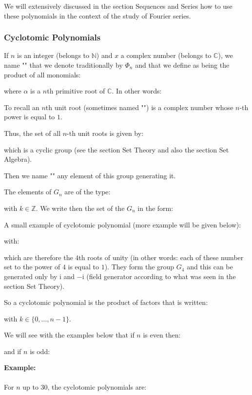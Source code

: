 	We will extensively discussed in the section Sequences and Series how to use these polynomials in the context of the study of Fourier series.
	
	\subsubsection{Cyclotomic Polynomials}
	If $n$ is an integer (belongs to $\mathbb{N}$) and $x$ a complex number (belongs to $\mathbb{C}$), we name "" that we denote traditionally by $\Phi_n$ and that we define as being the product of all monomials:
	
	where $\alpha$ is a $n$th primitive root of $\mathbb{C}$. In other words:
	
	To recall an $n$th unit root (sometimes named "") is a complex number whose $n$-th power is equal to $1$.
	
	Thus, the set of all $n$-th unit roots is given by:
	
	which is a cyclic group (see the section Set Theory and also the section Set Algebra).

	Then we name "" any element of this group generating it.
	
	The elements of $G_n$ are of the type:
	
	with $k\in \mathbb{Z}$. We write then the set of the $G_n$ in the form:
	
	A small example of cyclotomic polynomial (more example will be given below):
	
	with:
	
	which are therefore the $4$th roots of unity (in other words: each of these number set to the power of $4$ is equal to $1$). They form the group $G_4$ and this can be generated only by $\mathrm{i}$ and $-\mathrm{i}$ (field generator according to what was seen in the section Set Theory).
	
	So a cyclotomic polynomial is the product of factors that is written:
	
	with $k\in \{0,\ldots,n-1\}$.
	
	We will see with the examples below that if $n$ is even then:
	
	and if $n$ is odd:
	
	
	\pagebreak
	\begin{tcolorbox}[colframe=black,colback=white,sharp corners]
	\textbf{{\Large {}}Example:}\\\\
	For $n$ up to $30$, the cyclotomic polynomials are:
	
	\end{tcolorbox}
	

